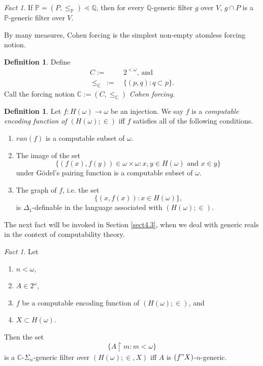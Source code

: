 \documentclass[12pt, twoside]{memoir}
\numberwithin{equation}{section}
\theoremstyle{definition}
\newtheorem{defi}[thm]{Definition}
\theoremstyle{remark}
\newtheorem{fact}[thm]{Fact}
\theoremstyle{definition}
\theoremstyle{definition}
\theoremstyle{definition}
\theoremstyle{remark}
\begin{document}
\begin{fact}\label{regsubo}
If $\mathbb{P} = (P, \leq_{\mathbb{P}}) \lessdot \mathbb{Q}$, then for every $\mathbb{Q}$-generic filter $g$ over $V$, $g \cap P$ is a $\mathbb{P}$-generic filter over $V$.
\end{fact}

By many measures, Cohen forcing is the simplest non-empty atomless forcing notion.

\begin{defi}
Define
\begin{align*}
    C := \ & 2^{< \omega} \text{, and} \\
    \leq_{\mathbb{C}} \ := \ & \{(p, q) : q \subset p\} \text{.}
\end{align*}
Call the forcing notion $\mathbb{C} := (C, \leq_{\mathbb{C}})$ \emph{Cohen forcing}.
\end{defi}

\begin{defi}\label{cefdef}
Let $f : H(\omega) \longrightarrow \omega$ be an injection. We say $f$ is a \emph{computable encoding function of} $(H(\omega); \in)$ iff $f$ satisfies all of the following conditions.
\begin{enumerate}[label=(\alph*)]
    \item $ran(f)$ is a computable subset of $\omega$.
    \item The image of the set 
    \begin{equation*}
        \{(f(x), f(y)) \in \omega \times \omega : x, y \in H(\omega) \text{ and } x \in y\}
    \end{equation*}
    under G\"{o}del's pairing function is a computable subset of $\omega$.
    \item The graph of $f$, i.e. the set 
    \begin{equation*}
        \{(x, f(x)) : x \in H(\omega)\} \text{,}
    \end{equation*}
    is $\Delta_1$-definable in the language associated with $(H(\omega); \in)$.
\end{enumerate}
\end{defi} 

The next fact will be invoked in Section \ref{sect4.3}, when we deal with generic reals in the context of computability theory.

\begin{fact}\label{f3230}
Let 
\begin{enumerate}[label=(\alph*)]
    \item $n < \omega$,
    \item $A \in 2^{\omega}$,
    \item $f$ be a computable encoding function of $(H(\omega); \in)$, and
    \item $X \subset H(\omega)$.
\end{enumerate}
Then the set $$\{A \restriction m : m < \omega\}$$ is a $\mathbb{C}$-$\Sigma_n$-generic filter over $(H(\omega); \in, X)$ iff $A$ is $(f" X)$-$n$-generic.
\end{fact}
\end{document}
